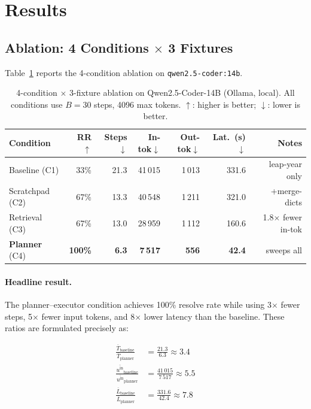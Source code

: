 \documentclass[11pt]{article}
\begin{document}
\section{Results}
\label{sec:results}

\subsection{Ablation: 4 Conditions $\times$ 3 Fixtures}
\label{sec:ablation}

Table~\ref{tab:ablation} reports the 4-condition ablation on
\texttt{qwen2.5-coder:14b}.

\begin{table}[ht]
\centering
\caption{%
  4-condition $\times$ 3-fixture ablation on Qwen2.5-Coder-14B (Ollama, local).
  All conditions use $B=30$ steps, 4096 max tokens.
  $\uparrow$: higher is better; $\downarrow$: lower is better.
}
\label{tab:ablation}
\begin{tabular}{lrrrrrr}
\toprule
\textbf{Condition} & \textbf{RR}$\uparrow$ & \textbf{Steps}$\downarrow$
  & \textbf{In-tok}$\downarrow$ & \textbf{Out-tok}$\downarrow$
  & \textbf{Lat.\ (s)}$\downarrow$ & \textbf{Notes} \\
\midrule
Baseline  (C1) & 33\%  & 21.3 & 41\,015 & 1\,013 & 331.6 & leap-year only \\
Scratchpad (C2) & 67\%  & 13.3 & 40\,548 & 1\,211 & 321.0 & +merge-dicts \\
Retrieval  (C3) & 67\%  & 13.0 & 28\,959 & 1\,112 & 160.6 & 1.8$\times$ fewer in-tok \\
\textbf{Planner} (C4) & \textbf{100\%} & \textbf{6.3} & \textbf{7\,517} & \textbf{556} & \textbf{42.4} & sweeps all \\
\bottomrule
\end{tabular}
\end{table}

\paragraph{Headline result.}
The planner--executor condition achieves 100\% resolve rate while using
3$\times$ fewer steps, 5$\times$ fewer input tokens, and 8$\times$ lower
latency than the baseline.  These ratios are formulated precisely as:

\begin{align}
  \frac{\overline{T}_{\text{baseline}}}{\overline{T}_{\text{planner}}} &= \frac{21.3}{6.3} \approx 3.4 \label{eq:step-ratio} \\[4pt]
  \frac{\overline{u^{\text{in}}}_{\text{baseline}}}{\overline{u^{\text{in}}}_{\text{planner}}} &= \frac{41\,015}{7\,517} \approx 5.5 \label{eq:token-ratio} \\[4pt]
  \frac{\overline{L}_{\text{baseline}}}{\overline{L}_{\text{planner}}} &= \frac{331.6}{42.4} \approx 7.8 \label{eq:latency-ratio}
\end{align}
\end{document}
